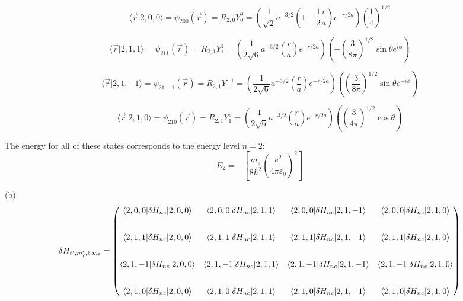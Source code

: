 \documentclass[11pt]{article}
\def\e{\epsilon}
\def\h{\hbar}
\def\l{\ell}
\def\la{\langle}
\def\ra{\rangle}
\newcommand{\Matrix}[1]{\begin{pmatrix} #1 \end{pmatrix}}
\renewcommand{\epsilon}{\varepsilon}
\theoremstyle{pink}
\theoremstyle{boxedsolution}
\theoremstyle{definition}
\theoremstyle{claim}
\begin{document}
\vspace{3mm}

\[\la \Vec{r}| 2,0,0\ra = \psi_{200}(\Vec{r})=R_{2,0}Y^{0}_0=
\left(
\frac{1}{\sqrt{2}}a^{-3/2}\left(1-\frac{1}{2}\frac{r}{a}\right)e^{-r/2a}
\right)
\left(
\frac{1}{4}
\right)^{1/2}\]

\vspace{3mm}

\[\la \Vec{r}| 2,1,1\ra = \psi_{211}(\Vec{r})=R_{2,1}Y^{1}_1=
\left(
\frac{1}{2\sqrt{6}}a^{-3/2}\left(\frac{r}{a}\right)e^{-r/2a}
\right)
\left(
-\left(\frac{3}{8\pi}\right)^{1/2}\sin\theta e^{i\phi}
\right)\]


\vspace{3mm}

\[\la \Vec{r}| 2,1,-1\ra = \psi_{21-1}(\Vec{r})=R_{2,1}Y^{-1}_1=
\left(
\frac{1}{2\sqrt{6}}a^{-3/2}\left(\frac{r}{a}\right)e^{-r/2a}
\right)
\left(
\left(\frac{3}{8\pi}\right)^{1/2}\sin\theta e^{-i\phi}
\right)\]

\vspace{3mm}

\[\la \Vec{r}| 2,1,0\ra = \psi_{210}(\Vec{r})=R_{2,1}Y^{0}_1=
\left(
\frac{1}{2\sqrt{6}}a^{-3/2}\left(\frac{r}{a}\right)e^{-r/2a}
\right)
\left(
\left(\frac{3}{4\pi}\right)^{1/2}\cos\theta
\right)\]

\vspace{3mm}
The energy for all of these states corresponds to the energy level $n=2$:
\[E_{2} = -\left[\frac{m_e}{8\h^2}\left(\frac{e^2}{4\pi\e_0}\right)^2\right]\]


(b)
\[\delta H_{\l',m_\l',\l,m_\l}=\Matrix{
\la2,0,0|\delta H_{nc}|2,0,0\ra & \la2,0,0|\delta H_{nc}|2,1,1\ra & \la2,0,0|\delta H_{nc}|2,1,-1\ra & \la2,0,0|\delta H_{nc}|2,1,0\ra\\
\vspace{3mm}
\\\la2,1,1|\delta H_{nc}|2,0,0\ra & \la2,1,1|\delta H_{nc}|2,1,1\ra & \la2,1,1|\delta H_{nc}|2,1,-1\ra & \la2,1,1|\delta H_{nc}|2,1,0\ra\\
\vspace{3mm}
\\\la2,1,-1|\delta H_{nc}|2,0,0\ra & \la2,1,-1|\delta H_{nc}|2,1,1\ra & \la2,1,-1|\delta H_{nc}|2,1,-1\ra & \la2,1,-1|\delta H_{nc}|2,1,0\ra\\
\vspace{3mm}
\\\la2,1,0|\delta H_{nc}|2,0,0\ra & \la2,1,0|\delta H_{nc}|2,1,1\ra & \la2,1,0|\delta H_{nc}|2,1,-1\ra & \la2,1,0|\delta H_{nc}|2,1,0\ra\\
}\]
\end{document}
